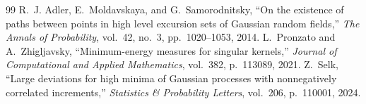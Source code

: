 \documentclass[10pt,a4paper]{amsart}
\begin{document}
\begin{thebibliography}{99}
 R.~J. Adler, E.~Moldavskaya, and G.~Samorodnitsky, ``On the existence of paths between points in high level excursion sets of {G}aussian random fields,'' {\em The Annals of Probability}, vol.~42, no.~3, pp.~1020--1053, 2014.
 L.~Pronzato and A.~Zhigljavsky, ``Minimum-energy measures for singular kernels,'' {\em Journal of Computational and Applied Mathematics}, vol.~382, p.~113089, 2021.
 Z.~Selk, ``Large deviations for high minima of {G}aussian processes with nonnegatively correlated increments,'' {\em Statistics \& Probability Letters}, vol.~206, p.~110001, 2024.
\end{thebibliography}
\end{document}
